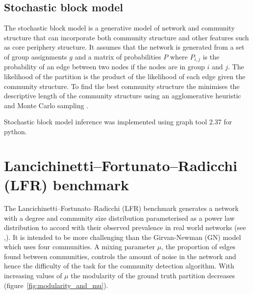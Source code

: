 \subsection{Stochastic block model}
\label{sec:stochastic block model}
The stochastic block model is a generative model of network and community structure that can incorporate both community structure and other features such as core periphery structure. It assumes that the network is generated from a set of group assignments $g$ and a matrix of probabilities $P$ where $P_{i,j}$ is the probability of an edge between two nodes if the nodes are in group $i$ and $j$. The likelihood of the partition is the product of the likelihood of each edge given the community structure. To find the best community structure the minimises the descriptive length of the community structure using an agglomerative heuristic and Monte Carlo sampling \cite{peixoto2014efficient}.

Stochastic block model inference was implemented using graph tool 2.37 for python\cite{peixoto_graph-tool_2014}. 






 \section{Lancichinetti–Fortunato–Radicchi (LFR) benchmark}
\label{sec:LFR benchmark}


The Lancichinetti–Fortunato–Radicchi (LFR) benchmark\cite{lancichinetti2008benchmark} generates a network with a degree  and community size distribution parameterised as a power law distribution\cite{lancichinetti2009community}  to accord with  their observed prevalence in real world networks (see \cite{radicchi2004defining},\cite{palla2005uncovering}). It is intended to be more challenging than the Girvan-Newman (GN) model which uses four communities\cite{girvan2002community}. A mixing parameter $\mu$, the proportion of edges found between communities, controls the amount of noise in the network and hence the difficulty of the task for the community detection algorithm. With increasing values of $\mu$ the modularity of the ground truth partition decreases (figure~\ref{fig:modularity_and_mu}).




